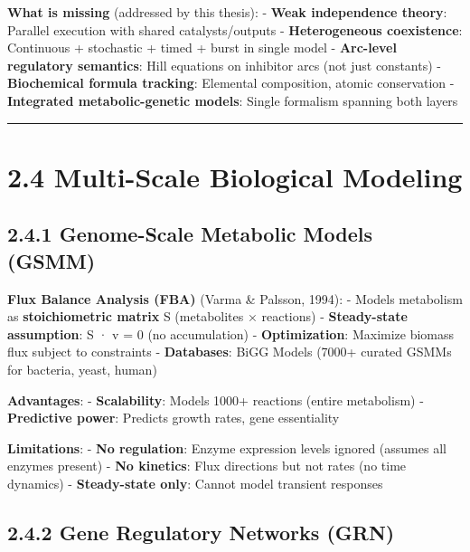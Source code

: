 \textbf{What is missing} (addressed by this thesis): - \texttimes \textbf{Weak
independence theory}: Parallel execution with shared catalysts/outputs -
\texttimes \textbf{Heterogeneous coexistence}: Continuous + stochastic + timed +
burst in single model - \texttimes \textbf{Arc-level regulatory semantics}: Hill
equations on inhibitor arcs (not just constants) - \texttimes
\textbf{Biochemical formula tracking}: Elemental composition, atomic
conservation - \texttimes \textbf{Integrated metabolic-genetic models}: Single
formalism spanning both layers

\begin{center}\rule{0.5\linewidth}{0.5pt}\end{center}

\hypertarget{multi-scale-biological-modeling}{%
\section{2.4 Multi-Scale Biological
Modeling}\label{multi-scale-biological-modeling}}

\hypertarget{genome-scale-metabolic-models-gsmm}{%
\subsection{2.4.1 Genome-Scale Metabolic Models
(GSMM)}\label{genome-scale-metabolic-models-gsmm}}

\textbf{Flux Balance Analysis (FBA)} (Varma \& Palsson, 1994): - Models
metabolism as \textbf{stoichiometric matrix} S (metabolites × reactions)
- \textbf{Steady-state assumption}: S · v = 0 (no accumulation) -
\textbf{Optimization}: Maximize biomass flux subject to constraints -
\textbf{Databases}: BiGG Models (7000+ curated GSMMs for bacteria,
yeast, human)

\textbf{Advantages}: - \textbf{Scalability}: Models 1000+ reactions
(entire metabolism) - \textbf{Predictive power}: Predicts growth rates,
gene essentiality

\textbf{Limitations}: - \textbf{No regulation}: Enzyme expression levels
ignored (assumes all enzymes present) - \textbf{No kinetics}: Flux
directions but not rates (no time dynamics) - \textbf{Steady-state
only}: Cannot model transient responses

\hypertarget{gene-regulatory-networks-grn}{%
\subsection{2.4.2 Gene Regulatory Networks
(GRN)}\label{gene-regulatory-networks-grn}}

